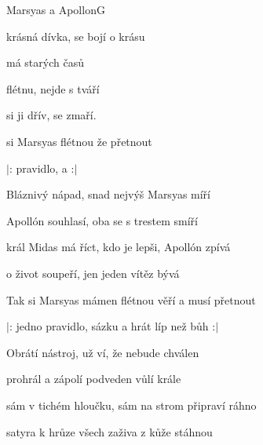 \setcounter{page}{50}
\begin{song}{Marsyas a Apollon}{G}{}

\begin{SBVerse}

 krásná dívka,  se bojí o  krásu

  má  starých  časů

 flétnu,  nejde s  tváří

 si ji  dřív,  se  zmaří.

\end{SBVerse}

\begin{SBChorus}

si Marsyas  flétnou  že  přetnout

$|$:  pravidlo,  a     :$|$

\end{SBChorus}

\begin{SBVerse}

Bláznivý nápad, snad nejvýš Marsyas míří

Apollón souhlasí, oba se s trestem smíří

král Midas má říct, kdo je lepši, Apollón zpívá

o život soupeří, jen jeden vítěz bývá

\end{SBVerse}

\begin{SBChorus}

Tak si Marsyas mámen flétnou věří a musí přetnout

$|$: jedno pravidlo, sázku a hrát líp než bůh :$|$

\end{SBChorus}

\begin{SBVerse}

Obrátí nástroj, už ví, že nebude chválen

prohrál a zápolí podveden vůlí krále

sám v tichém hloučku, sám na strom připraví ráhno

satyra k hrůze všech zaživa z kůže stáhnou

\end{SBVerse}


\end{song}
